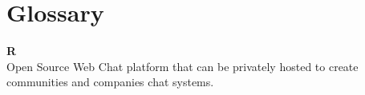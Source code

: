 \section{Glossary}

\textbf{\huge{R}}\\
Open Source Web Chat platform that can be privately hosted to create communities and companies chat systems.
